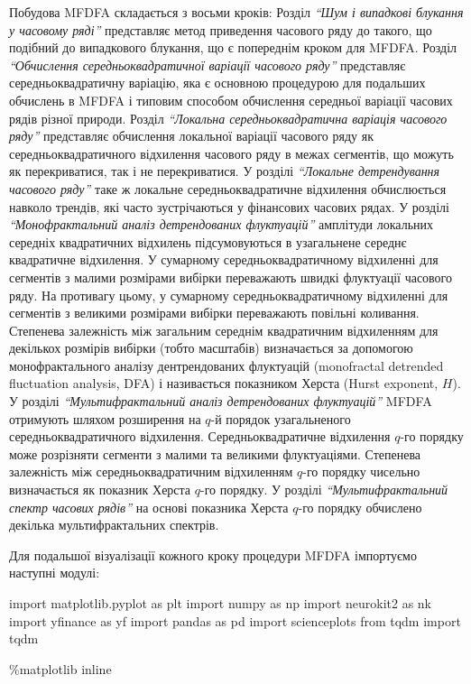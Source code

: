 \documentclass[
  letterpaper,
]{report}
\newenvironment{Shaded}{\begin{snugshade}}{\end{snugshade}}
\newcommand{\ImportTok}[1]{\textcolor[rgb]{0.00,0.46,0.62}{#1}}
\newcommand{\NormalTok}[1]{\textcolor[rgb]{0.00,0.23,0.31}{#1}}
\newcommand{\OperatorTok}[1]{\textcolor[rgb]{0.37,0.37,0.37}{#1}}
\begin{document}
Побудова MFDFA складається з восьми кроків: Розділ \emph{``Шум і
випадкові блукання у часовому ряді''} представляє метод приведення
часового ряду до такого, що подібний до випадкового блукання, що є
попереднім кроком для MFDFA. Розділ \emph{``Обчислення
середньоквадратичної варіації часового ряду''} представляє
середньоквадратичну варіацію, яка є основною процедурою для подальших
обчислень в MFDFA і типовим способом обчислення середньої варіації
часових рядів різної природи. Розділ \emph{``Локальна
середньоквадратична варіація часового ряду''} представляє обчислення
локальної варіації часового ряду як середньоквадратичного відхилення
часового ряду в межах сегментів, що можуть як перекриватися, так і не
перекриватися. У розділі \emph{``Локальне детрендування часового ряду''}
таке ж локальне середньоквадратичне відхилення обчислюється навколо
трендів, які часто зустрічаються у фінансових часових рядах. У розділі
\emph{``Монофрактальний аналіз детрендованих флуктуацій''} амплітуди
локальних середніх квадратичних відхилень підсумовуються в узагальнене
середнє квадратичне відхилення. У сумарному середньоквадратичному
відхиленні для сегментів з малими розмірами вибірки переважають швидкі
флуктуації часового ряду. На противагу цьому, у сумарному
середньоквадратичному відхиленні для сегментів з великими розмірами
вибірки переважають повільні коливання. Степенева залежність між
загальним середнім квадратичним відхиленням для декількох розмірів
вибірки (тобто масштабів) визначається за допомогою монофрактального
аналізу дентрендованих флуктуацій (monofractal detrended fluctuation
analysis, DFA) і називається показником Херста (Hurst exponent, \(H\)).
У розділі \emph{``Мультифрактальний аналіз детрендованих флуктуацій''}
MFDFA отримують шляхом розширення на \(q\)-й порядок узагальненого
середньоквадратичного відхилення. Середньоквадратичне відхилення
\(q\)-го порядку може розрізняти сегменти з малими та великими
флуктуаціями. Степенева залежність між середньоквадратичним відхиленням
\(q\)-го порядку чисельно визначається як показник Херста \(q\)-го
порядку. У розділі \emph{``Мультифрактальний спектр часових рядів''} на
основі показника Херста \(q\)-го порядку обчислено декілька
мультифрактальних спектрів.

Для подальшої візуалізації кожного кроку процедури MFDFA імпортуємо
наступні модулі:

\begin{Shaded}
\begin{Highlighting}[]
\ImportTok{import}\NormalTok{ matplotlib.pyplot }\ImportTok{as}\NormalTok{ plt }
\ImportTok{import}\NormalTok{ numpy }\ImportTok{as}\NormalTok{ np}
\ImportTok{import}\NormalTok{ neurokit2 }\ImportTok{as}\NormalTok{ nk}
\ImportTok{import}\NormalTok{ yfinance }\ImportTok{as}\NormalTok{ yf}
\ImportTok{import}\NormalTok{ pandas }\ImportTok{as}\NormalTok{ pd}
\ImportTok{import}\NormalTok{ scienceplots}
\ImportTok{from}\NormalTok{ tqdm }\ImportTok{import}\NormalTok{ tqdm}

\OperatorTok{\%}\NormalTok{matplotlib inline}
\end{Highlighting}
\end{Shaded}
\end{document}
